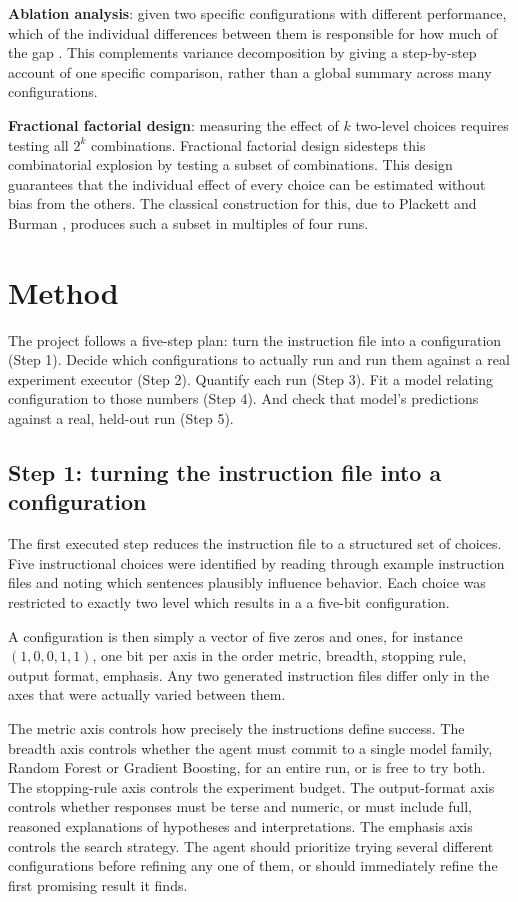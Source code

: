 \documentclass[11pt]{article}
\begin{document}
\textbf{Ablation analysis}: given two specific configurations with different performance, which of the individual differences between them is responsible for how much of the gap \cite{fawcetthoos}. This complements variance decomposition by giving a step-by-step account of one specific comparison, rather than a global summary across many configurations.

\textbf{Fractional factorial design}: measuring the effect of $k$ two-level choices requires testing all $2^k$ combinations. Fractional factorial design sidesteps this combinatorial explosion by testing a subset of combinations. This design guarantees that the individual effect of every choice can be estimated without bias from the others. The classical construction for this, due to Plackett and Burman \cite{plackettburman}, produces such a subset in multiples of four runs.
\section{Method}
\label{sec:methodology}

The project follows a five-step plan: turn the instruction file into a configuration (Step 1). Decide which configurations to actually run and run them against a real experiment executor (Step 2). Quantify each run (Step 3). Fit a model relating configuration to those numbers (Step 4). And check that model's predictions against a real, held-out run (Step 5).

\subsection{Step 1: turning the instruction file into a configuration}
\label{sec:configspace}

The first executed step reduces the instruction file to a  structured set of choices. Five instructional choices were identified by reading through example instruction files and noting which sentences plausibly influence behavior. Each choice was restricted to exactly two level which results in a a five-bit configuration.

A configuration is then simply a vector of five zeros and ones, for instance $(1,0,0,1,1)$, one bit per axis in the order metric, breadth, stopping rule, output format, emphasis. Any two generated instruction files differ only in the axes that were actually varied between them.

The metric axis controls how precisely the instructions define success. The breadth axis controls whether the agent must commit to a single model family, Random Forest or Gradient Boosting, for an entire run, or is free to try both. The stopping-rule axis controls the experiment budget. The output-format axis controls whether responses must be terse and numeric, or must include full, reasoned explanations of hypotheses and interpretations. The emphasis axis controls the search strategy. The agent should prioritize trying several different configurations before refining any one of them, or should immediately refine the first promising result it finds.
\end{document}
